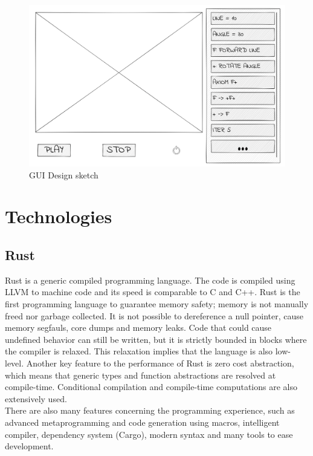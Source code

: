 \documentclass[a4paper]{article}
\begin{document}
\begin{figure}[h]
    \includegraphics[width=\textwidth]{media/design/ui_design.pdf}
    \caption{GUI Design sketch}
\end{figure}

\pagebreak

\section{Technologies}

\subsection{Rust}

\gls{Rust}\cite{rust} is a generic compiled programming language.
The code is compiled using LLVM to machine code and its speed
is comparable to \gls{C} and \gls{C++}.
\gls{Rust} is the first programming language to guarantee memory safety;
memory is not manually freed nor garbage collected.
It is not possible to dereference a null pointer, cause memory segfauls, %
core dumps and memory leaks.
Code that could cause undefined behavior can still be written,
but it is strictly bounded in blocks where the compiler is relaxed.
This relaxation implies that the language is also low-level.
Another key feature to the performance of \gls{Rust} is zero cost abstraction,
which means that generic types and function abstractions are resolved at compile-time.
Conditional compilation and compile-time computations are also extensively used.
\\
There are also many features concerning the programming experience, such as
advanced metaprogramming and code generation using macros, intelligent compiler,
dependency system (Cargo), modern syntax and many tools to ease development.
\end{document}

